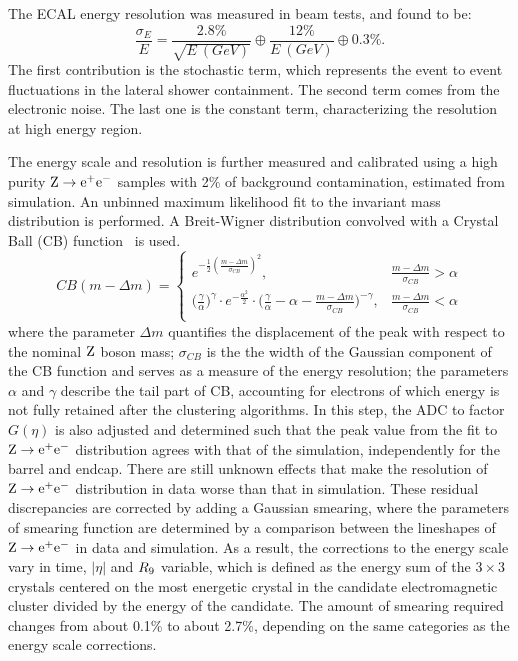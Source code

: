 		The ECAL energy resolution was measured in beam tests, and found to be:
		\begin{equation}
		\frac{\sigma_{E}}{E}=\frac{2.8\%}{\sqrt{E\ (GeV)}} \oplus \frac{12\%}{E\ (GeV)} \oplus 0.3\%.
		\end{equation}
		The first contribution is the stochastic term, which represents the event to event fluctuations in the lateral shower containment.
		The second term comes from the electronic noise. The last one is the constant term, characterizing the resolution at high energy region. 

	 		The energy scale and resolution is further measured and calibrated using a high purity $\mathrm{Z}\to\mathrm{e}^+\mathrm{e}^-$ samples with 2\% of background contamination, estimated from simulation. An unbinned maximum likelihood fit to the invariant mass distribution is performed. A Breit-Wigner distribution convolved with a Crystal Ball (CB) function~\cite{CBall} is used.
	 	\begin{equation}
			\label{eq:bwcb}
			CB(m-\Delta m)=
				\begin{cases}
				e^{-\frac{1}{2}(\frac{m-\Delta m}{\sigma_{CB}})^2 },& \frac{m-\Delta m}{\sigma_{CB}}>\alpha\\
				\bigl(\frac{\gamma}{\alpha}\bigr)^\gamma\cdot e^{-\frac{\alpha^2}{2}}
				\cdot\biggl(\frac{\gamma}{\alpha}-\alpha-
				\frac{m-\Delta m}{\sigma_{CB}}\biggr)^{-\gamma}, & \frac{m-\Delta m}{\sigma_{CB}}<\alpha  \\
				\end{cases}
	\end{equation}
	where the parameter $\Delta m$ quantifies the displacement of the peak with respect to the nominal $\mathrm{Z}$ boson mass; $\sigma_{CB}$ is the the width of the Gaussian component of the CB function and serves as a measure of the energy resolution; the parameters $\alpha$ and $\gamma$ describe the tail part of CB, accounting for electrons of which energy is not fully retained after the clustering algorithms. In this step, the ADC to \GeV factor $\mathit{G}(\eta)$ is also adjusted and determined such that the peak value from the fit to $\mathrm{Z}\to \mathrm{e}^+\mathrm{e}^-$ distribution agrees with that of the simulation, independently for the barrel and endcap. There are still unknown effects that make the resolution of $\mathrm{Z}\to\mathrm{e}^+\mathrm{e}^-$ distribution in data worse than that in simulation. These residual discrepancies are corrected by adding a Gaussian smearing, where the parameters of smearing function are determined by a comparison between the lineshapes of $\mathrm{Z}\to\mathrm{e}^+\mathrm{e}^-$ in data and simulation.  
	As a result, the corrections to the energy scale vary in time, $|\eta|$ and $R_\mathrm{9}$ variable, which is defined as the energy sum of the $3\times3$ crystals centered on the most energetic crystal in the candidate electromagnetic cluster divided by the energy of the candidate. The amount of smearing required changes from about 0.1\% to about 2.7\%, depending on the same categories as the energy scale corrections.
